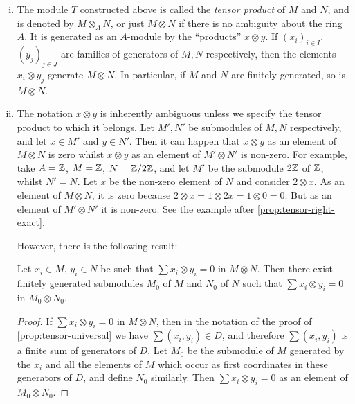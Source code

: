 \begin{remark}
\begin{enumerate}[i)]
    \item The module $T$ constructed above is called the \emph{tensor product} of $M$ and $N$, and is denoted by $M \otimes_A N$, or just $M \otimes N$ if there is no ambiguity about the ring $A$. It is generated as an $A$-module by the ``products'' $x \otimes y$. If $(x_i)_{i \in I}$, $(y_j)_{j \in J}$ are families of generators of $M, N$ respectively, then the elements $x_i \otimes y_j$ generate $M \otimes N$. In particular, if $M$ and $N$ are finitely generated, so is $M \otimes N$.
    
    \item The notation $x \otimes y$ is inherently ambiguous unless we specify the tensor product to which it belongs. Let $M', N'$ be submodules of $M, N$ respectively, and let $x \in M'$ and $y \in N'$. Then it can happen that $x \otimes y$ as an element of $M \otimes N$ is zero whilst $x \otimes y$ as an element of $M' \otimes N'$ is non-zero. For example, take $A = \mathbb{Z}$, $M = \mathbb{Z}$, $N = \mathbb{Z}/2\mathbb{Z}$, and let $M'$ be the submodule $2\mathbb{Z}$ of $\mathbb{Z}$, whilst $N' = N$. Let $x$ be the non-zero element of $N$ and consider $2 \otimes x$. As an element of $M \otimes N$, it is zero because $2 \otimes x = 1 \otimes 2x = 1 \otimes 0 = 0$. But as an element of $M' \otimes N'$ it is non-zero. See the example after \eqref{prop:tensor-right-exact}.
    
    However, there is the following result:

    \begin{corollary}
        Let $x_i \in M$, $y_i \in N$ be such that $\sum x_i \otimes y_i = 0$ in $M \otimes N$. Then there exist finitely generated submodules $M_0$ of $M$ and $N_0$ of $N$ such that $\sum x_i \otimes y_i = 0$ in $M_0 \otimes N_0$.
    \end{corollary}

    \begin{proof}
        If $\sum x_i \otimes y_i = 0$ in $M \otimes N$, then in the notation of the proof of \eqref{prop:tensor-universal} we have $\sum (x_i, y_i) \in D$, and therefore $\sum (x_i, y_i)$ is a finite sum of generators of $D$. Let $M_0$ be the submodule of $M$ generated by the $x_i$ and all the elements of $M$ which occur as first coordinates in these generators of $D$, and define $N_0$ similarly. Then $\sum x_i \otimes y_i = 0$ as an element of $M_0 \otimes N_0$.
    \end{proof}


\end{enumerate}
\end{remark}
